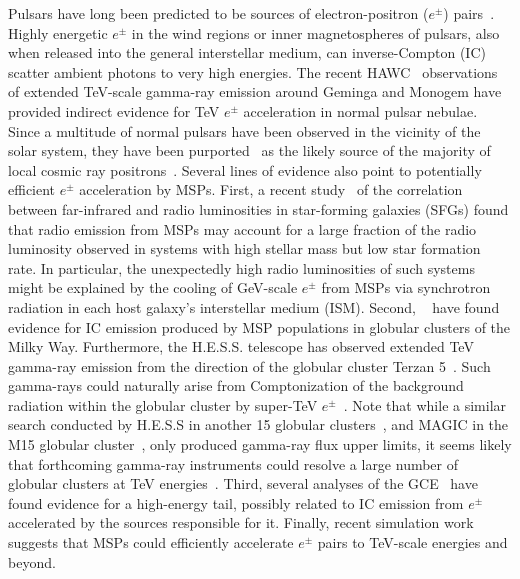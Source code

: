 \documentclass[doublespace,nopageskip]{VTthesis} %
\begin{document}
Pulsars have long been predicted to be sources of electron-positron ($e^{\pm}$) pairs~\citep{Erber:1966,Sturrock:1970,Sturrock:1971, Aharonian:1995, Atoyan:1995}. Highly energetic $e^{\pm}$ in the wind regions or inner magnetospheres of pulsars, 
also when released into the general interstellar medium,
can inverse-Compton (IC) scatter ambient photons to very high energies. 
The recent HAWC~\citep{Abeysekara:2017old} observations of extended TeV-scale gamma-ray emission around Geminga and Monogem have provided indirect evidence for TeV $e^{\pm}$ acceleration in normal pulsar nebulae.  Since a multitude of normal pulsars have been observed in the vicinity of the solar system, they have been purported~\citep{Hooper:2008kg, Delahaye:2010,Abeysekara:2017old,Hooper:2017gtd, Profumo:2018fmz, DiMauro:2019yvh, Johannesson:2019jlk} as the likely source of the majority of local cosmic ray positrons~\citep{Aguilar:2013qda}.    
Several lines of evidence also point to potentially efficient $e^{\pm}$ acceleration by MSPs. First, a recent study~\citep{Sudoh:2020hyu} of the correlation between far-infrared and radio luminosities in star-forming galaxies (SFGs) found that radio emission from MSPs may account for a large fraction of the radio luminosity observed in systems with high stellar mass but low star formation rate. 
%
In particular, the unexpectedly high radio luminosities of such
systems
might be explained by the cooling of GeV-scale $e^{\pm}$ from MSPs via synchrotron radiation in each host galaxy's interstellar medium (ISM). Second, ~\citet{Song:2021zrs} have found evidence for IC emission produced by MSP populations in globular clusters of the Milky Way. Furthermore, the H.E.S.S. telescope has observed extended TeV gamma-ray emission from the direction of the globular cluster Terzan 5~\citep{Abramowski:2013md}. Such gamma-rays could naturally arise from Comptonization of the background radiation within the globular cluster by super-TeV $e^{\pm}$~\citep{Bednarek:2016gpp}. 
%
Note that while a similar search conducted by H.E.S.S in another 15 globular clusters~\citep{Abramowski:2013md}, and MAGIC in the M15 globular cluster~\citep{Acciari:2019ysf}, only produced gamma-ray flux upper limits, it seems likely that forthcoming gamma-ray instruments could resolve a large number of globular clusters at TeV energies~\citep{Ndiyavala:2017hoh,Ndiyavala-Davids:2020wjc}. 
Third, several analyses of the GCE~\citep[e.g.,][]{Horiuchi:2016zwu,Linden:2016rcf,DiMauro:2021raz} have found evidence for a high-energy tail, possibly related to IC emission from $e^\pm$ accelerated by the sources responsible for it. 
%
Finally, recent simulation work \citep{Guepin:2019fjb} suggests that MSPs could efficiently accelerate $e^{\pm}$ pairs to TeV-scale energies and beyond. 
\end{document}
